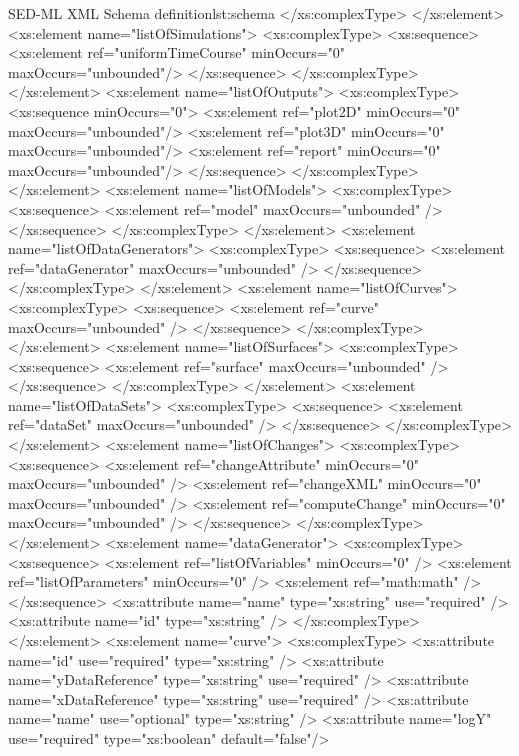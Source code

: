 \begin{myXmlLst}{SED-ML XML Schema definition}{lst:schema}
		</xs:complexType>
	</xs:element>
	<xs:element name="listOfSimulations">
		<xs:complexType>
			<xs:sequence>
				<xs:element ref="uniformTimeCourse" minOccurs="0" maxOccurs="unbounded"/>
			</xs:sequence>
		</xs:complexType>
	</xs:element>
	<xs:element name="listOfOutputs">
		<xs:complexType>
			<xs:sequence minOccurs="0">
				<xs:element ref="plot2D" minOccurs="0"  maxOccurs="unbounded"/>
				<xs:element ref="plot3D" minOccurs="0"  maxOccurs="unbounded"/>
				<xs:element ref="report" minOccurs="0"  maxOccurs="unbounded"/>
			</xs:sequence>
		</xs:complexType>
	</xs:element>
	<xs:element name="listOfModels">
		<xs:complexType>
			<xs:sequence>
				<xs:element ref="model" maxOccurs="unbounded" />
			</xs:sequence>
		</xs:complexType>
	</xs:element>
	<xs:element name="listOfDataGenerators">
		<xs:complexType>
			<xs:sequence>
				<xs:element ref="dataGenerator" maxOccurs="unbounded" />
			</xs:sequence>
		</xs:complexType>
	</xs:element>
	<xs:element name="listOfCurves">
		<xs:complexType>
			<xs:sequence>
				<xs:element ref="curve" maxOccurs="unbounded" />
			</xs:sequence>
		</xs:complexType>
	</xs:element>
	<xs:element name="listOfSurfaces">
		<xs:complexType>
			<xs:sequence>
				<xs:element ref="surface" maxOccurs="unbounded" />
			</xs:sequence>
		</xs:complexType>
	</xs:element>
	<xs:element name="listOfDataSets">
		<xs:complexType>
			<xs:sequence>
				<xs:element ref="dataSet" maxOccurs="unbounded" />
			</xs:sequence>
		</xs:complexType>
	</xs:element>
	<xs:element name="listOfChanges">
		<xs:complexType>
			<xs:sequence>
				<xs:element ref="changeAttribute" minOccurs="0"
					maxOccurs="unbounded" />
				<xs:element ref="changeXML" minOccurs="0" maxOccurs="unbounded" />
				<xs:element ref="computeChange" minOccurs="0" maxOccurs="unbounded" />
			</xs:sequence>
		</xs:complexType>
	</xs:element>
	<xs:element name="dataGenerator">
		<xs:complexType>
			<xs:sequence>
				<xs:element ref="listOfVariables" minOccurs="0" />
				<xs:element ref="listOfParameters" minOccurs="0" />
				<xs:element ref="math:math" />
			</xs:sequence>
			<xs:attribute name="name" type="xs:string" use="required" />
			<xs:attribute name="id" type="xs:string" />
		</xs:complexType>
	</xs:element>
	<xs:element name="curve">
		<xs:complexType>
		<xs:attribute name="id" use="required" type="xs:string" />
			<xs:attribute name="yDataReference" type="xs:string"
				use="required" />
			<xs:attribute name="xDataReference" type="xs:string"
				use="required" />
			<xs:attribute name="name" use="optional" type="xs:string" />
			<xs:attribute name="logY" use="required" type="xs:boolean" default="false"/>

\end{myXmlLst}
